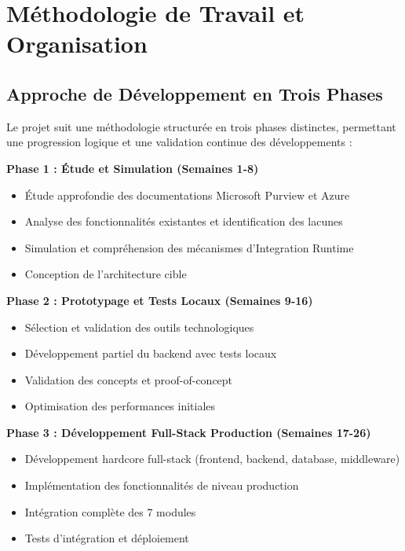 \documentclass[a4paper,12pt]{article}
\begin{document}
\newpage

\section{Méthodologie de Travail et Organisation}

\subsection{Approche de Développement en Trois Phases}

Le projet suit une méthodologie structurée en trois phases distinctes, permettant une progression logique et une validation continue des développements :

\textbf{Phase 1 : Étude et Simulation (Semaines 1-8)}
\begin{itemize}
    \item Étude approfondie des documentations Microsoft Purview et Azure
    \item Analyse des fonctionnalités existantes et identification des lacunes
    \item Simulation et compréhension des mécanismes d'Integration Runtime
    \item Conception de l'architecture cible
\end{itemize}

\textbf{Phase 2 : Prototypage et Tests Locaux (Semaines 9-16)}
\begin{itemize}
    \item Sélection et validation des outils technologiques
    \item Développement partiel du backend avec tests locaux
    \item Validation des concepts et proof-of-concept
    \item Optimisation des performances initiales
\end{itemize}

\textbf{Phase 3 : Développement Full-Stack Production (Semaines 17-26)}
\begin{itemize}
    \item Développement hardcore full-stack (frontend, backend, database, middleware)
    \item Implémentation des fonctionnalités de niveau production
    \item Intégration complète des 7 modules
    \item Tests d'intégration et déploiement
\end{itemize}
\end{document}
